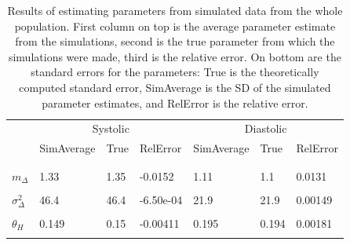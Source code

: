 \documentclass[
]{article}
\begin{document}
\begin{table}[!h]
\centering
\caption{\label{tab:testparameters}Results of estimating parameters from simulated data from the whole population. 
    First column on top is the average parameter estimate from the simulations, second is the true parameter from which the simulations were made, third is the relative error.
    On bottom are the standard errors for the parameters: True is the theoretically computed standard error, SimAverage is the SD of the simulated parameter estimates, and RelError is the relative error.}
\centering
\begin{tabular}[t]{lllllll}
\toprule
\multicolumn{1}{c}{ } & \multicolumn{3}{c}{Systolic} & \multicolumn{3}{c}{Diastolic} \\
\cmidrule(l{3pt}r{3pt}){2-4} \cmidrule(l{3pt}r{3pt}){5-7}
  & SimAverage & True & RelError & SimAverage & True & RelError\\
\midrule
\addlinespace[0.3em]
\multicolumn{7}{l}{\textbf{Parameter estimates}}\\
\cellcolor{gray!10}{\hspace{1em}$m_M$} & \cellcolor{gray!10}{123} & \cellcolor{gray!10}{123} & \cellcolor{gray!10}{1.26e-04} & \cellcolor{gray!10}{72.3} & \cellcolor{gray!10}{72.3} & \cellcolor{gray!10}{-4.34e-04}\\
\hspace{1em}$m_\Delta$ & 1.33 & 1.35 & -0.0152 & 1.11 & 1.1 & 0.0131\\
\cellcolor{gray!10}{\hspace{1em}$\sigma^2_M$} & \cellcolor{gray!10}{377} & \cellcolor{gray!10}{377} & \cellcolor{gray!10}{7.77e-04} & \cellcolor{gray!10}{104} & \cellcolor{gray!10}{104} & \cellcolor{gray!10}{0.00298}\\
\hspace{1em}$\sigma^2_\Delta$ & 46.4 & 46.4 & -6.50e-04 & 21.9 & 21.9 & 0.00149\\
\cellcolor{gray!10}{\hspace{1em}$\alpha_H$} & \cellcolor{gray!10}{2.17} & \cellcolor{gray!10}{2.16} & \cellcolor{gray!10}{0.00492} & \cellcolor{gray!10}{2.31} & \cellcolor{gray!10}{2.32} & \cellcolor{gray!10}{-0.0036}\\
\hspace{1em}$\theta_H$ & 0.149 & 0.15 & -0.00411 & 0.195 & 0.194 & 0.00181\\
\cellcolor{gray!10}{\hspace{1em}$\alpha_C$} & \cellcolor{gray!10}{2.59} & \cellcolor{gray!10}{2.57} & \cellcolor{gray!10}{0.0085} & \cellcolor{gray!10}{2.79} & \cellcolor{gray!10}{2.76} & \cellcolor{gray!10}{0.0111}\\

\end{tabular}
\end{table}
\end{document}
